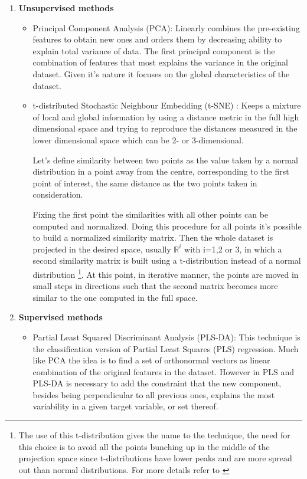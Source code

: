 \begin{enumerate}
\item \textbf{Unsupervised methods}
	\begin{itemize}
		\item Principal Component Analysis (PCA):\cite{PCA} Linearly combines the pre-existing features to obtain new ones and orders them by decreasing ability to explain total variance of data. The first principal component is the combination of features that most explains the variance in the original dataset. Given it's nature it focuses on the global characteristics of the dataset.
		\item t-distributed Stochastic Neighbour Embedding (t-SNE) \cite{t-sne}: Keeps a mixture of local and global information by using a distance metric in the full high dimensional space and trying to reproduce the distances measured in the lower dimensional space which can be 2- or 3-dimensional.

Let's define similarity between two points as the value taken by a normal distribution in a point away from the centre, corresponding to the first point of interest, the same distance as the two points taken in consideration. 

Fixing the first point the similarities with all other points can be computed and normalized. Doing this procedure for all points it's possible to build a normalized similarity matrix. Then the whole dataset is projected in the desired space, usually $\mathbb{R}^i$ with i=1,2 or 3, in which a second similarity matrix is built using a t-distribution instead of a normal distribution \footnote{The use of this t-distribution gives the name to the technique, the need for this choice is to avoid all the points bunching up in the middle of the projection space since t-distributions have lower peaks and are more spread out than normal distributions. For more details refer to \cite{t-sne}}. At this point, in iterative manner, the points are moved in small steps in directions such that the second matrix becomes more similar to the one computed in the full space.
\end{itemize}

\item \textbf{Supervised methods}
	\begin{itemize}
	\item Partial Least Squared Discriminant Analysis (PLS-DA): This technique is the classification version of Partial Least Squares (PLS) regression. Much like PCA the idea is to find a set of orthonormal vectors as linear combination of the original features in the dataset. However in PLS and PLS-DA is necessary to add the constraint that the new component, besides being perpendicular to all previous ones, explains the most variability in a given target variable, or set thereof.


\end{itemize}
\end{enumerate}
